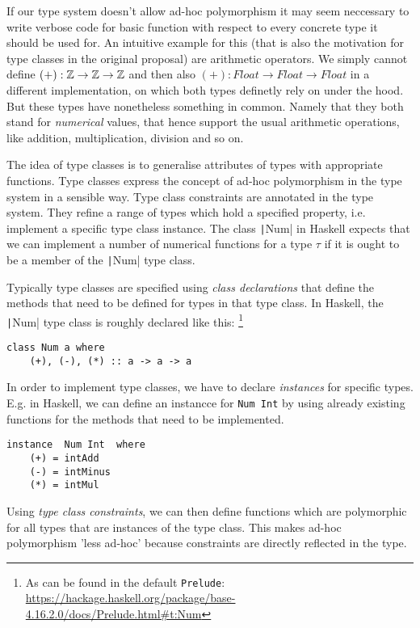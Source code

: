 If our type system doesn't allow ad-hoc polymorphism it may seem neccessary to write verbose code for basic function with respect to every concrete type it should be used for.
An intuitive example for this (that is also the motivation for type classes in the original proposal) are arithmetic operators.
We simply cannot define $(+) : \mathbb{Z} \to \mathbb{Z} \to \mathbb{Z}$ and then also $(+) : \mathit{Float} \to \mathit{Float} \to \mathit{Float}$ in a different implementation, on which both types definetly rely on under the hood.
But these types have nonetheless something in common. Namely that they both stand for \emph{numerical} values, that hence support the usual arithmetic operations, like addition, multiplication, division and so on.

The idea of type classes is to generalise attributes of types with appropriate functions.
Type classes express the concept of ad-hoc polymorphism in the type system in a sensible  way.
Type class constraints are annotated in the type system. They refine a range of types which hold a specified property, i.e. implement a specific type class instance.
The class \texttt|Num| in Haskell expects that we can implement a number of numerical functions for a type $\tau$ if it is ought to be a member of the \texttt|Num| type class.

Typically type classes are specified using \emph{class declarations} that define the methods that need to be defined for types in that type class.
In Haskell, the \texttt|Num| type class is roughly declared like this:
\footnote{As can be found in the default \texttt{Prelude}: \url{https://hackage.haskell.org/package/base-4.16.2.0/docs/Prelude.html\#t:Num}}

\begin{verbatim}
class Num a where
    (+), (-), (*) :: a -> a -> a
\end{verbatim}

In order to implement type classes, we have to declare \emph{instances} for specific types.
E.g. in Haskell, we can define an instancce for \texttt{Num Int} by using already existing functions for the methods that need to be implemented.

\begin{verbatim}
instance  Num Int  where
    (+) = intAdd
    (-) = intMinus
    (*) = intMul
\end{verbatim}

Using \emph{type class constraints}, we can then define functions which are polymorphic for all types that are instances of the type class.
This makes ad-hoc polymorphism 'less ad-hoc' \cite{wadlerblott} because constraints are directly reflected in the type.

